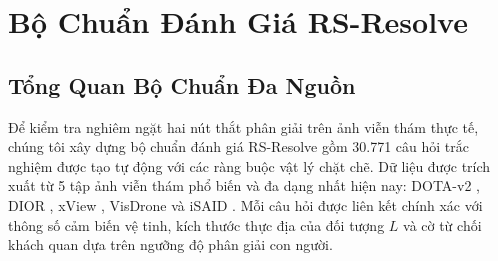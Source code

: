 \section{Bộ Chuẩn Đánh Giá RS-Resolve}
\label{sec:benchmark}

\subsection{Tổng Quan Bộ Chuẩn Đa Nguồn}
Để kiểm tra nghiêm ngặt hai nút thắt phân giải trên ảnh viễn thám thực tế, chúng tôi xây dựng bộ chuẩn đánh giá RS-Resolve gồm 30.771 câu hỏi trắc nghiệm được tạo tự động với các ràng buộc vật lý chặt chẽ. Dữ liệu được trích xuất từ 5 tập ảnh viễn thám phổ biến và đa dạng nhất hiện nay: DOTA-v2 \cite{dotav2}, DIOR \cite{dior2020}, xView \cite{xview2018}, VisDrone \cite{visdrone2021} và iSAID \cite{isaid2019}. Mỗi câu hỏi được liên kết chính xác với thông số cảm biến vệ tinh, kích thước thực địa của đối tượng $L$ và cờ từ chối khách quan dựa trên ngưỡng độ phân giải con người.

\begin{table}[t]
\centering
\caption{Thống kê bộ chuẩn RS-Resolve theo các nguồn dữ liệu viễn thám.}
\label{tab:dataset_stats}
\end{table}

